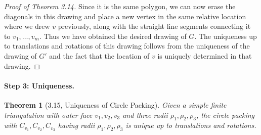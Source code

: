 \documentclass[UTF8,11pt]{ctexart}
\newtheorem*{theorem}{Theorem}
\theoremstyle{definition}
\begin{document}
\begin{proof}[Proof of Theorem 3.14]
Since it is the same polygon, we can now erase the diagonals in this drawing and place a new vertex in the same relative location where we drew $v$ previously, along with the straight line segments connecting it to $v_1,\ldots,v_m$. Thus we have obtained the desired drawing of $G$. The uniqueness up to translations and rotations of this drawing follows from the uniqueness of the drawing of $G'$ and the fact that the location of $v$ is uniquely determined in that drawing.
\end{proof}

\paragraph{Step 3: Uniqueness.}
\begin{theorem}[3.15, Uniqueness of Circle Packing]
Given a simple finite triangulation with outer face $v_1,v_2,v_3$ and three radii $\rho_1,\rho_2,\rho_3$, the circle packing with $C_{v_1},C_{v_2},C_{v_3}$ having radii $\rho_1,\rho_2,\rho_3$ is unique up to translations and rotations.
\end{theorem}
\end{document}
